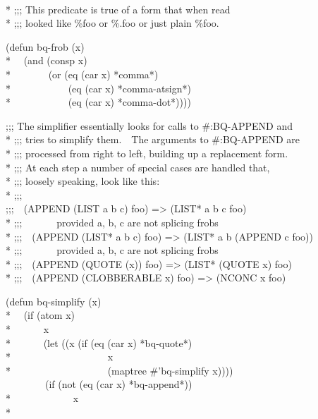 \begin{new}
\begin{lisp}
\end{lisp}
\begin{lisp}
 \\*
;;; This predicate is true of a form that when read \\*
;;; looked like \%{\Xatsign}foo or \%.foo or just plain \%foo.
\end{lisp}
\begin{lisp}
(defun bq-frob (x) \\*
~~(and (consp x) \\*
~~~~~~~(or (eq (car x) *comma*) \\*
~~~~~~~~~~~(eq (car x) *comma-atsign*) \\*
~~~~~~~~~~~(eq (car x) *comma-dot*))))
\end{lisp}
\begin{lisp}
;;; The simplifier essentially looks for calls to \#:BQ-APPEND and \\*
;;; tries to simplify them.~~The arguments to \#:BQ-APPEND are \\*
;;; processed from right to left, building up a replacement form. \\*
;;; At each step a number of special cases are handled that, \\*
;;; loosely speaking, look like this: \\*
;;; \\
;;;~~(APPEND (LIST a b c) foo) => (LIST* a b c foo) \\*
;;;~~~~~~~provided a, b, c are not splicing frobs \\*
;;;~~(APPEND (LIST* a b c) foo) => (LIST* a b (APPEND c foo)) \\*
;;;~~~~~~~provided a, b, c are not splicing frobs \\*
;;;~~(APPEND (QUOTE (x)) foo) => (LIST* (QUOTE x) foo) \\*
;;;~~(APPEND (CLOBBERABLE x) foo) => (NCONC x foo)
\end{lisp}
\begin{lisp}
(defun bq-simplify (x) \\*
~~(if (atom x) \\*
~~~~~~x \\*
~~~~~~(let ((x (if (eq (car x) *bq-quote*) \\*
~~~~~~~~~~~~~~~~~~~x \\*
~~~~~~~~~~~~~~~~~~~(maptree \#'bq-simplify x)))) \\
~~~~~~~~(if (not (eq (car x) *bq-append*)) \\*
~~~~~~~~~~~~x \\*

\end{lisp}
\end{new}
